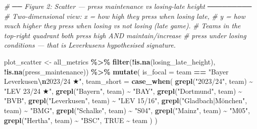 \documentclass[
]{article}
\newenvironment{Shaded}{\begin{snugshade}}{\end{snugshade}}
\newcommand{\AttributeTok}[1]{\textcolor[rgb]{0.13,0.29,0.53}{#1}}
\newcommand{\CommentTok}[1]{\textcolor[rgb]{0.56,0.35,0.01}{\textit{#1}}}
\newcommand{\ConstantTok}[1]{\textcolor[rgb]{0.56,0.35,0.01}{#1}}
\newcommand{\FunctionTok}[1]{\textcolor[rgb]{0.13,0.29,0.53}{\textbf{#1}}}
\newcommand{\NormalTok}[1]{#1}
\newcommand{\OtherTok}[1]{\textcolor[rgb]{0.56,0.35,0.01}{#1}}
\newcommand{\SpecialCharTok}[1]{\textcolor[rgb]{0.81,0.36,0.00}{\textbf{#1}}}
\newcommand{\StringTok}[1]{\textcolor[rgb]{0.31,0.60,0.02}{#1}}
\begin{document}
\begin{Shaded}
\begin{Highlighting}[]
\CommentTok{\# ── Figure 2: Scatter — press maintenance vs losing{-}late height ─────────}
\CommentTok{\# Two{-}dimensional view: x = how high they press when losing late,}
\CommentTok{\# y = how much higher they press when losing vs not losing (late game).}
\CommentTok{\# Teams in the top{-}right quadrant both press high AND maintain/increase}
\CommentTok{\# press under losing conditions — that is Leverkusen\textquotesingle{}s hypothesised signature.}

\NormalTok{plot\_scatter }\OtherTok{\textless{}{-}}\NormalTok{ all\_metrics }\SpecialCharTok{\%\textgreater{}\%}
  \FunctionTok{filter}\NormalTok{(}\SpecialCharTok{!}\FunctionTok{is.na}\NormalTok{(losing\_late\_height), }\SpecialCharTok{!}\FunctionTok{is.na}\NormalTok{(press\_maintenance)) }\SpecialCharTok{\%\textgreater{}\%}
  \FunctionTok{mutate}\NormalTok{(}
    \AttributeTok{is\_focal    =}\NormalTok{ team }\SpecialCharTok{==} \StringTok{"Bayer Leverkusen}\SpecialCharTok{\textbackslash{}n}\StringTok{2023/24 ★"}\NormalTok{,}
    \AttributeTok{team\_short  =} \FunctionTok{case\_when}\NormalTok{(}
      \FunctionTok{grepl}\NormalTok{(}\StringTok{"2023/24"}\NormalTok{, team)           }\SpecialCharTok{\textasciitilde{}} \StringTok{"LEV 23/24 ★"}\NormalTok{,}
      \FunctionTok{grepl}\NormalTok{(}\StringTok{"Bayern"}\NormalTok{,  team)           }\SpecialCharTok{\textasciitilde{}} \StringTok{"BAY"}\NormalTok{,}
      \FunctionTok{grepl}\NormalTok{(}\StringTok{"Dortmund"}\NormalTok{, team)          }\SpecialCharTok{\textasciitilde{}} \StringTok{"BVB"}\NormalTok{,}
      \FunctionTok{grepl}\NormalTok{(}\StringTok{"Leverkusen"}\NormalTok{, team)        }\SpecialCharTok{\textasciitilde{}} \StringTok{"LEV 15/16"}\NormalTok{,}
      \FunctionTok{grepl}\NormalTok{(}\StringTok{"Gladbach|Mönchen"}\NormalTok{, team)  }\SpecialCharTok{\textasciitilde{}} \StringTok{"BMG"}\NormalTok{,}
      \FunctionTok{grepl}\NormalTok{(}\StringTok{"Schalke"}\NormalTok{, team)           }\SpecialCharTok{\textasciitilde{}} \StringTok{"S04"}\NormalTok{,}
      \FunctionTok{grepl}\NormalTok{(}\StringTok{"Mainz"}\NormalTok{,   team)           }\SpecialCharTok{\textasciitilde{}} \StringTok{"M05"}\NormalTok{,}
      \FunctionTok{grepl}\NormalTok{(}\StringTok{"Hertha"}\NormalTok{,  team)           }\SpecialCharTok{\textasciitilde{}} \StringTok{"BSC"}\NormalTok{,}
      \ConstantTok{TRUE} \SpecialCharTok{\textasciitilde{}}\NormalTok{ team}
\NormalTok{    )}
\NormalTok{  )}


\end{Highlighting}
\end{Shaded}
\end{document}
